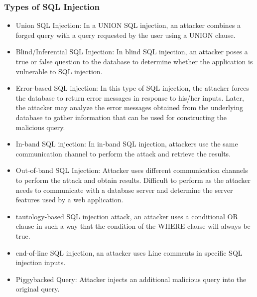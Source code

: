 \subsubsection{Types of SQL Injection}
\begin{itemize}
    \item Union SQL Injection: In a UNION SQL injection, an attacker combines a forged query with a query requested by the user using a UNION clause.
    \item Blind/Inferential SQL Injection: In blind SQL injection, an attacker poses a true or false question to the database to determine whether the application is vulnerable to SQL injection.
    \item Error-based SQL injection: In this type of SQL injection, the attacker forces the database to return error messages in response to his/her inputs. Later, the attacker may analyze the error messages obtained from the underlying database to gather information that can be used for constructing the malicious query.
    \item In-band SQL injection: In in-band SQL injection, attackers use the same communication channel to perform the attack and retrieve the results.
    \item Out-of-band SQL Injection: Attacker uses different communication channels to perform the attack and obtain results. Difficult to perform as the attacker needs to communicate with a database server and determine the server features used by a web application.
    \item tautology-based SQL injection attack, an attacker uses a conditional OR clause in such a way that the condition of the WHERE clause will always be true.
    \item end-of-line SQL injection, an attacker uses Line comments in specific SQL injection inputs.
    \item Piggybacked Query: Attacker injects an additional malicious query into the original query.
\end{itemize}
